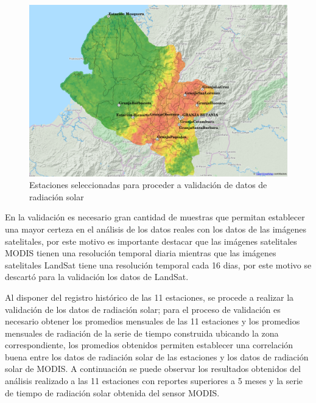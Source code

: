 \begin{figure}[htb]
  \centering 
  \includegraphics[scale=0.45]{pictures/stationstested.png}
  \caption{Estaciones seleccionadas para proceder a validación de datos de radiación solar}
  \label{fig:stationstested}
\end{figure}
En la validación es necesario gran cantidad de muestras que permitan establecer una mayor certeza en el análisis de los datos reales con los datos de las imágenes
satelitales, por este motivo es importante destacar que las imágenes satelitales MODIS tienen una resolución temporal diaria mientras que las imágenes 
satelitales LandSat tiene una resolución temporal cada 16 dias, por este motivo se descartó para la validación los datos de LandSat.

Al disponer del registro histórico de las 11 estaciones, se procede a realizar la validación de los datos de radiación solar; para el proceso de validación es 
necesario obtener los promedios mensuales de las 11 estaciones y los promedios mensuales de radiación de la serie de tiempo construida ubicando la zona 
correspondiente, los promedios obtenidos permiten establecer una correlación buena entre los datos de radiación solar de las estaciones y los datos de radiación 
solar de MODIS. A continuación se puede observar los resultados obtenidos del análisis realizado a las 11 estaciones con reportes superiores a 5 meses y 
la serie de tiempo de radiación solar obtenida del sensor MODIS.

